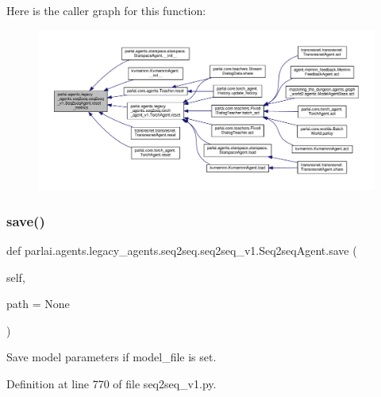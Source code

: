 Here is the caller graph for this function\+:
\nopagebreak
\begin{figure}[H]
\begin{center}
\leavevmode
\includegraphics[width=350pt]{classparlai_1_1agents_1_1legacy__agents_1_1seq2seq_1_1seq2seq__v1_1_1Seq2seqAgent_a521db011d2188e8e513976af5737c322_icgraph}
\end{center}
\end{figure}
\mbox{\label{classparlai_1_1agents_1_1legacy__agents_1_1seq2seq_1_1seq2seq__v1_1_1Seq2seqAgent_a8aa6a1efae9091dc0b38af3ce4b49706}} 
\subsubsection{\texorpdfstring{save()}{save()}}
{\footnotesize\ttfamily def parlai.\+agents.\+legacy\+\_\+agents.\+seq2seq.\+seq2seq\+\_\+v1.\+Seq2seq\+Agent.\+save (\begin{DoxyParamCaption}\item[{}]{self,  }\item[{}]{path = {\ttfamily None} }\end{DoxyParamCaption})}

\begin{DoxyVerb}Save model parameters if model_file is set.\end{DoxyVerb}
 

Definition at line 770 of file seq2seq\+\_\+v1.\+py.



